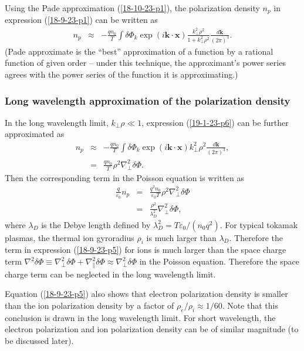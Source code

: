 \documentclass{article}
\begin{document}
Using the Pade approximation (\ref{18-10-23-p1}), the polarization density
$n_p$ in expression (\ref{18-9-23-p1}) can be written as
\begin{eqnarray}
  n_p & \approx & - \frac{q n_0}{T} \int \delta \Phi_k \exp (i\mathbf{k} \cdot
  \mathbf{x}) \frac{k_{\perp}^2 \rho^2}{1 + k_{\perp}^2 \rho^2}
  \frac{d\mathbf{k}}{(2 \pi)^3} .  \label{19-1-23-p6}
\end{eqnarray}
(Pade approximate is the ``best'' approximation of a function by a rational
function of given order -- under this technique, the approximant's power
series agrees with the power series of the function it is approximating.)

\subsubsection{Long wavelength approximation of the polarization density}

In the long wavelength limit, $k_{\perp} \rho \ll 1$, expression
(\ref{19-1-23-p6}) can be further approximated as
\begin{eqnarray}
  n_p & \approx & - \frac{q n_0}{T} \int \delta \Phi_k \exp (i\mathbf{k} \cdot
  \mathbf{x}) k_{\perp}^2 \rho^2 \frac{d\mathbf{k}}{(2 \pi)^3}, \nonumber\\
  & = & \frac{q n_0}{T} \rho^2 \nabla_{\perp}^2 \delta \Phi . 
  \label{19-1-23-p5}
\end{eqnarray}
Then the corresponding term in the Poisson equation is written as
\begin{eqnarray}
  \frac{q}{\varepsilon_0} n_p & = & \frac{q^2 n_0}{\varepsilon_0 T} \rho^2
  \nabla_{\perp}^2 \delta \Phi \nonumber\\
  & = & \frac{\rho^2}{\lambda_D^2} \nabla_{\perp}^2 \delta \Phi, 
  \label{18-9-23-p5}
\end{eqnarray}
where $\lambda_D$ is the Debye length defined by $\lambda_D^2 = T
\varepsilon_0 / (n_0 q^2)$. For typical tokamak plasmas, the thermal ion
gyroradius $\rho_i$ is much larger than $\lambda_D$. Therefore the term in
expression (\ref{18-9-23-p5}) for ions is much larger than the space charge
term $\nabla^2 \delta \Phi \equiv \nabla^2_{\perp} \delta \Phi +
\nabla^2_{\parallel} \delta \Phi \approx \nabla^2_{\perp} \delta \Phi$ in the
Poisson equation. Therefore the space charge term can be neglected in the long
wavelength limit.

Equation (\ref{18-9-23-p5}) also shows that electron polarization density is
smaller than the ion polarization density by a factor of $\rho_e / \rho_i
\approx 1 / 60$. Note that this conclusion is drawn in the long wavelength
limit. For short wavelength, the electron polarization and ion polarization
density can be of similar magnitude (to be discussed later).
\end{document}
